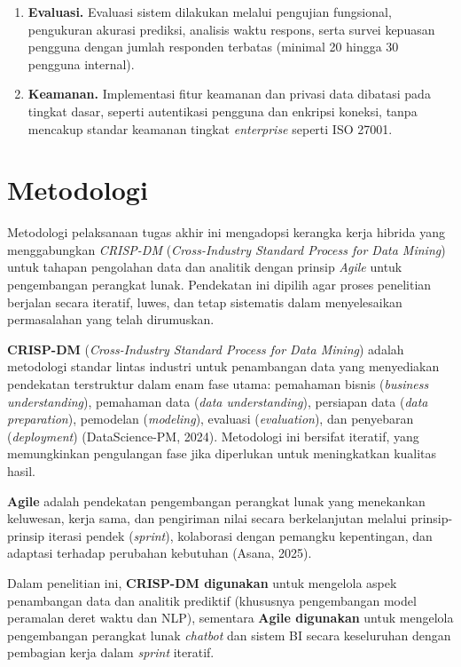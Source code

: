 \begin{enumerate}
  \item \textbf{Evaluasi.} Evaluasi sistem dilakukan melalui pengujian fungsional, pengukuran akurasi prediksi, analisis waktu respons, serta survei kepuasan pengguna dengan jumlah responden terbatas (minimal 20 hingga 30 pengguna internal).

  \item \textbf{Keamanan.} Implementasi fitur keamanan dan privasi data dibatasi pada tingkat dasar, seperti autentikasi pengguna dan enkripsi koneksi, tanpa mencakup standar keamanan tingkat \textit{enterprise} seperti ISO 27001.
\end{enumerate}

\section{Metodologi}

Metodologi pelaksanaan tugas akhir ini mengadopsi kerangka kerja hibrida yang menggabungkan \textit{CRISP-DM} (\textit{Cross-Industry Standard Process for Data Mining}) untuk tahapan pengolahan data dan analitik dengan prinsip \textit{Agile} untuk pengembangan perangkat lunak. Pendekatan ini dipilih agar proses penelitian berjalan secara iteratif, luwes, dan tetap sistematis dalam menyelesaikan permasalahan yang telah dirumuskan.

\textbf{CRISP-DM} (\textit{Cross-Industry Standard Process for Data Mining}) adalah metodologi standar lintas industri untuk penambangan data yang menyediakan pendekatan terstruktur dalam enam fase utama: pemahaman bisnis (\textit{business understanding}), pemahaman data (\textit{data understanding}), persiapan data (\textit{data preparation}), pemodelan (\textit{modeling}), evaluasi (\textit{evaluation}), dan penyebaran (\textit{deployment}) (DataScience-PM, 2024). Metodologi ini bersifat iteratif, yang memungkinkan pengulangan fase jika diperlukan untuk meningkatkan kualitas hasil.

\textbf{Agile} adalah pendekatan pengembangan perangkat lunak yang menekankan keluwesan, kerja sama, dan pengiriman nilai secara berkelanjutan melalui prinsip-prinsip iterasi pendek (\textit{sprint}), kolaborasi dengan pemangku kepentingan, dan adaptasi terhadap perubahan kebutuhan (Asana, 2025).

Dalam penelitian ini, \textbf{CRISP-DM digunakan} untuk mengelola aspek penambangan data dan analitik prediktif (khususnya pengembangan model peramalan deret waktu dan NLP), sementara \textbf{Agile digunakan} untuk mengelola pengembangan perangkat lunak \textit{chatbot} dan sistem BI secara keseluruhan dengan pembagian kerja dalam \textit{sprint} iteratif.

